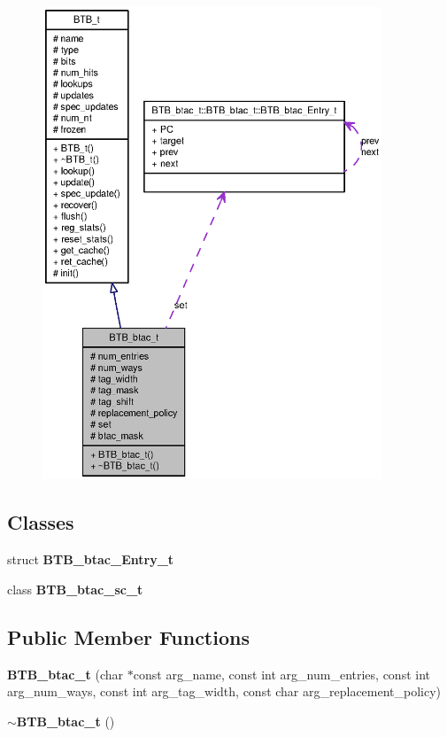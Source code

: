 \begin{figure}[H]
\begin{center}
\leavevmode
\includegraphics[height=400pt]{classBTB__btac__t__coll__graph}
\end{center}
\end{figure}
\subsection*{Classes}
\begin{CompactItemize}
\item 
struct {\bf BTB\_\-btac\_\-Entry\_\-t}
\item 
class {\bf BTB\_\-btac\_\-sc\_\-t}
\end{CompactItemize}
\subsection*{Public Member Functions}
\begin{CompactItemize}
\item 
{\bf BTB\_\-btac\_\-t} (char $\ast$const arg\_\-name, const int arg\_\-num\_\-entries, const int arg\_\-num\_\-ways, const int arg\_\-tag\_\-width, const char arg\_\-replacement\_\-policy)
\item 
{\bf $\sim$BTB\_\-btac\_\-t} ()
\end{CompactItemize}
